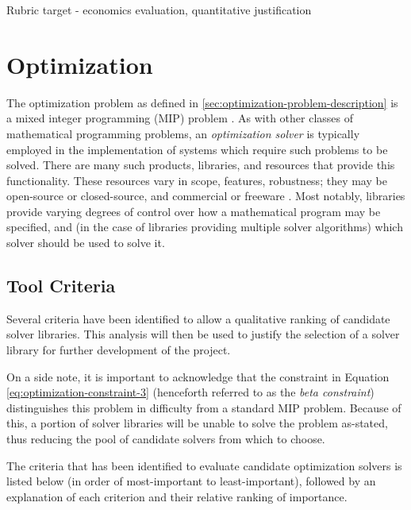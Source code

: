 \documentclass[../mthe-493-final-project.tex]{subfiles}
\begin{document}
    Rubric target - economics evaluation, quantitative justification

    \section{Optimization}
    \label{sec:optimization-engineering-tools}
    
    
    The optimization problem as defined in \ref{sec:optimization-problem-description} is a mixed integer programming (MIP) problem \cite{wolsey_mip}. As with other classes of mathematical programming problems, an \textit{optimization solver} is typically employed in the implementation of systems which require such problems to be solved. There are many such products, libraries, and resources that provide this functionality. These resources vary in scope, features, robustness; they may be open-source or closed-source, and commercial or freeware \cite{greenberg_nature_2010}. Most notably, libraries provide varying degrees of control over how a mathematical program may be specified, and (in the case of libraries providing multiple solver algorithms) which solver should be used to solve it.
    
    \subsection{Tool Criteria}
    \label{ssec:optimization-tool-criteria}
    
    Several criteria have been identified to allow a qualitative ranking of candidate solver libraries. This analysis will then be used to justify the selection of a solver library for further development of the project.
    
    On a side note, it is important to acknowledge that the constraint in Equation \ref{eq:optimization-constraint-3} (henceforth referred to as the \textit{beta constraint}) distinguishes this problem in difficulty from a standard MIP problem. Because of this, a portion of solver libraries will be unable to solve the problem as-stated, thus reducing the pool of candidate solvers from which to choose.
    
    The criteria that has been identified to evaluate candidate optimization solvers is listed below (in order of most-important to least-important), followed by an explanation of each criterion and their relative ranking of importance.
    
\end{document}
